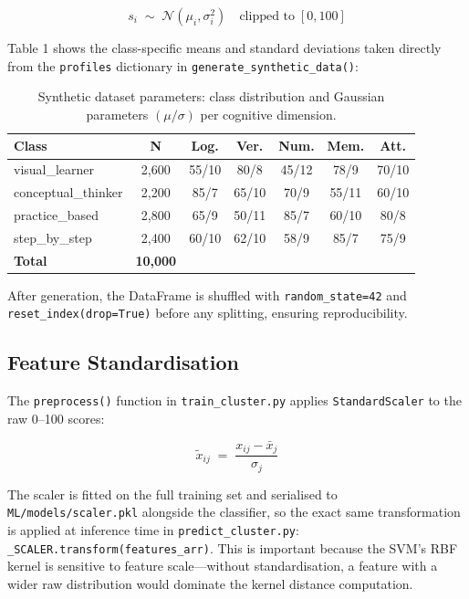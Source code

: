 \documentclass[12pt,a4paper]{article}
\begin{document}
\begin{equation}
  s_i \;\sim\; \mathcal{N}(\mu_i, \sigma_i^2)
  \quad\text{clipped to}\;[0,100]
\end{equation}

Table 1 shows the class-specific means and standard deviations
taken directly from the \texttt{profiles} dictionary in
\texttt{generate\_synthetic\_data()}:

\begin{table}[H]
  \centering
  \caption{Synthetic dataset parameters: class distribution and
           Gaussian parameters
           $(\mu/\sigma)$ per cognitive dimension.}
  \small
  \begin{tabular}{lcccccc}
    \toprule
    \textbf{Class} & \textbf{N} &
    \textbf{Log.} & \textbf{Ver.} & \textbf{Num.} &
    \textbf{Mem.} & \textbf{Att.} \\
    \midrule
    visual\_learner      & 2,600 & 55/10 & 80/8  & 45/12 & 78/9  & 70/10 \\
    conceptual\_thinker  & 2,200 & 85/7  & 65/10 & 70/9  & 55/11 & 60/10 \\
    practice\_based      & 2,800 & 65/9  & 50/11 & 85/7  & 60/10 & 80/8  \\
    step\_by\_step       & 2,400 & 60/10 & 62/10 & 58/9  & 85/7  & 75/9  \\
    \midrule
    \textbf{Total} & \textbf{10,000} & & & & & \\
    \bottomrule
  \end{tabular}
\end{table}

After generation, the DataFrame is shuffled with
\texttt{random\_state=42} and \texttt{reset\_index(drop=True)}
before any splitting, ensuring reproducibility.

\subsection{Feature Standardisation}

The \texttt{preprocess()} function in \texttt{train\_cluster.py}
applies \texttt{StandardScaler} to the raw 0--100 scores:

\begin{equation}
  \tilde{x}_{ij} \;=\; \frac{x_{ij} - \bar{x}_j}{\sigma_j}
\end{equation}

The scaler is fitted on the full training set and serialised to
\texttt{ML/models/scaler.pkl} alongside the classifier, so the
exact same transformation is applied at inference time in
\texttt{predict\_cluster.py}: \texttt{\_SCALER.transform(features\_arr)}.
This is important because the SVM's RBF kernel is sensitive to
feature scale---without standardisation, a feature with a wider
raw distribution would dominate the kernel distance computation.
\end{document}

